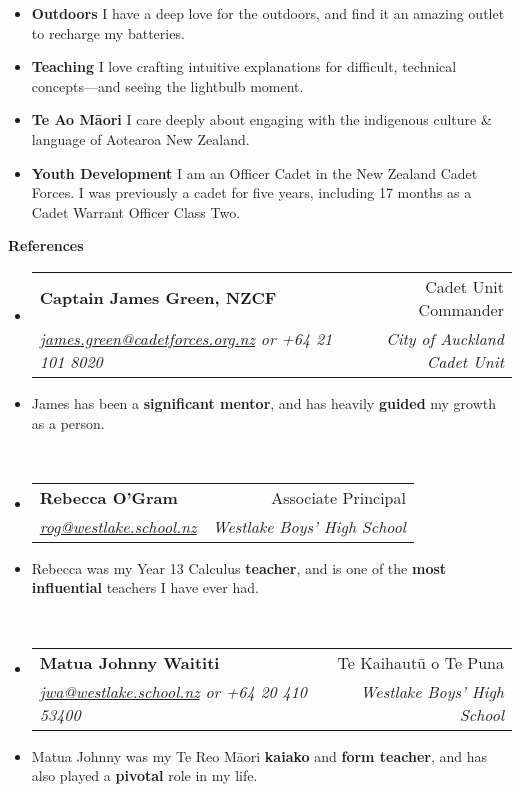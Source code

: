 \documentclass[11pt,a4paper]{article}[leftmargin=*]
\makeatletter
\def \entryspacing {-0pt}
\renewcommand{\section}[2]{\vspace{5pt}
  \colorbox{secondary}{\color{white}\raggedbottom\normalsize\textbf{{#1}{\hspace{2pt}#2}}}
}
\newcommand{\resumeEntryStart}{\begin{itemize}[leftmargin=2.5mm]}
\newcommand{\resumeEntryEnd}{\end{itemize}\vspace{\entryspacing}}
\newcommand{\resumeEntryTSDL}[4]{
  \vspace{-1pt}\item[]
    \begin{tabularx}{0.97\textwidth}{X@{\hspace{60pt}}r}
      \textbf{\color{primary}#1} & {\firabook\color{accent}\small#2} \\
      \textit{\color{accent}\small#3} & \textit{\color{accent}\small#4} \\
    \end{tabularx}\vspace{-6pt}
}
\newcommand{\resumeEntryS}[2]{
  \item[]\small{
    \textbf{\color{primary}#1 }{ #2 \vspace{-4pt}}
  }
}
\newcommand{\resumeEntryP}[1]{
  \item[]\small{
    #1 \vspace{-6pt}
  }\\
}
\newcommand{\resumeBf}[1]{\small\textbf{\color{halfbold}#1}}
\makeatother
\begin{document}
\resumeEntryStart
\resumeEntryS
{Outdoors}
{
  I have a deep love for the outdoors, and find it an amazing outlet to recharge my batteries.
}

\resumeEntryS
{Teaching}
{
  I love crafting intuitive explanations for difficult, technical concepts---and seeing the lightbulb moment.
}

\resumeEntryS
{Te Ao Māori}
{
  I care deeply about engaging with the indigenous culture \& language of Aotearoa New Zealand.
}

\resumeEntryS
{Youth Development}
{
  I am an Officer Cadet in the New Zealand Cadet Forces. I was previously a cadet for five years, including 17 months as a Cadet Warrant Officer Class Two.
}
\resumeEntryEnd

\pagebreak


\section{\faUserCheck}{References}

\resumeEntryStart
\resumeEntryTSDL
{Captain James Green, NZCF}{Cadet Unit Commander}
{\href{mailto:james.green@cadetforces.org.nz}{james.green@cadetforces.org.nz} or +64 21 101 8020}{City of Auckland Cadet Unit}

\resumeEntryP{
  James has been a \resumeBf{significant mentor}, and has heavily \resumeBf{guided} my growth as a person.
}
\resumeEntryEnd

\resumeEntryStart
\resumeEntryTSDL
{Rebecca O'Gram}{Associate Principal}
{\href{mailto:rog@westlake.school.nz}{rog@westlake.school.nz}}{Westlake Boys' High School}

\resumeEntryP{
  Rebecca was my Year 13 Calculus \resumeBf{teacher}, and is one of the \resumeBf{most influential} teachers I have ever had.
}
\resumeEntryEnd

\resumeEntryStart
\resumeEntryTSDL
{Matua Johnny Waititi}{Te Kaihautū o Te Puna}
{\href{mailto:jwa@westlake.school.nz}{jwa@westlake.school.nz} or +64 20 410 53400}{Westlake Boys' High School}

\resumeEntryP{
  Matua Johnny was my Te Reo Māori \resumeBf{kaiako} and \resumeBf{form teacher}, and has also played a \resumeBf{pivotal} role in my life.
}
\resumeEntryEnd
\end{document}
